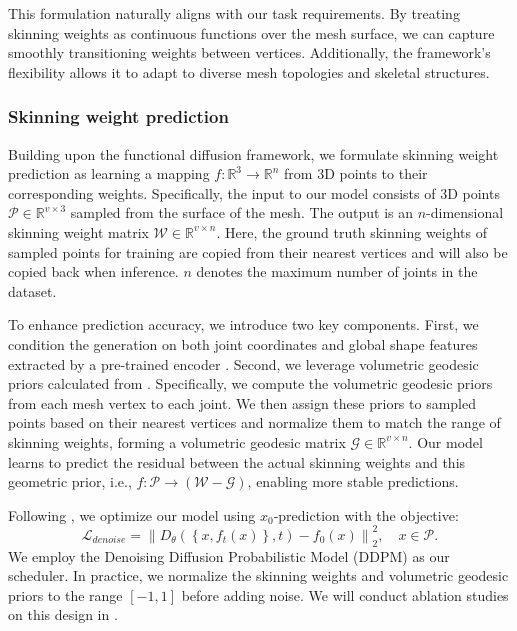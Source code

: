 This formulation naturally aligns with our task requirements. By treating skinning weights as continuous functions over the mesh surface, we can capture smoothly transitioning weights between vertices. Additionally, the framework's flexibility allows it to adapt to diverse mesh topologies and skeletal structures.

\subsubsection{Skinning weight prediction}
Building upon the functional diffusion framework, we formulate skinning weight prediction as learning a mapping \( f: \mathbb{R}^3 \rightarrow \mathbb{R}^n \) from 3D points to their corresponding weights. Specifically, the input to our model consists of 3D points \( \mathcal{P} \in \mathbb{R}^{v \times 3} \) sampled from the surface of the mesh. The output is an \( n \)-dimensional skinning weight matrix \( \mathcal{W} \in \mathbb{R}^{v \times n} \). Here, the ground truth skinning weights of sampled points for training are copied from their nearest vertices and will also be copied back when inference. $n$ denotes the maximum number of joints in the dataset.

To enhance prediction accuracy, we introduce two key components. 
First, we condition the generation on both joint coordinates and global shape features extracted by a pre-trained encoder \cite{zhao2024michelangelo}. 
Second, we leverage volumetric geodesic priors calculated from \cite{dionne2013geodesic}. Specifically, we compute the volumetric geodesic priors from each mesh vertex to each joint. We then assign these priors to sampled points based on their nearest vertices and normalize them to match the range of skinning weights, forming a volumetric geodesic matrix $\mathcal{G} \in \mathbb{R}^{v \times n}$. Our model learns to predict the residual between the actual skinning weights and this geometric prior, i.e., $f: \mathcal{P} \rightarrow (\mathcal{W}-\mathcal{G})$, enabling more stable predictions.

Following \cite{zhang2024functional}, we optimize our model using $x_0$-prediction with the objective:
\begin{equation}
   \mathcal{L}_{denoise} = \left\| D_{\theta} \left( \left\{ x, f_t(x) \right\}, t \right) - f_0(x) \right\|^2_2, \quad x \in \mathcal{P}.
\end{equation}
We employ the Denoising Diffusion Probabilistic Model (DDPM) \cite{ho2020denoising} as our scheduler. In practice, we normalize the skinning weights and volumetric geodesic priors to the range \([-1, 1]\) before adding noise. We will conduct ablation studies on this design in .


